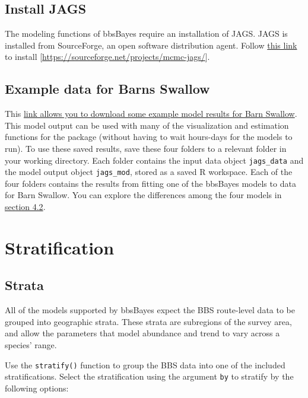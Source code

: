 \documentclass[
]{book}
\begin{document}
\hypertarget{install-jags}{%
\section{Install JAGS}\label{install-jags}}

The modeling functions of bbsBayes require an installation of JAGS. JAGS is installed from SourceForge, an open software distribution agent. Follow \href{https://sourceforge.net/projects/mcmc-jags/}{this link} to install {[}\url{https://sourceforge.net/projects/mcmc-jags/}{]}.

\hypertarget{example-data-for-barns-swallow}{%
\section{Example data for Barns Swallow}\label{example-data-for-barns-swallow}}

This \href{https://drive.google.com/drive/folders/1ar7nUNI3GXm1A_Kcoc2cAUQQ7ZV37wC6?usp=sharing}{link allows you to download some example model results for Barn Swallow}. This model output can be used with many of the visualization and estimation functions for the package (without having to wait hours-days for the models to run). To use these saved results, save these four folders to a relevant folder in your working directory. Each folder contains the input data object \texttt{jags\_data} and the model output object \texttt{jags\_mod}, stored as a saved R workspace. Each of the four folders contains the results from fitting one of the bbsBayes models to data for Barn Swallow. You can explore the differences among the four models in \protect\hyperlink{Model_list}{section 4.2}.

\hypertarget{Stratify}{%
\chapter{Stratification}\label{Stratify}}

\hypertarget{strata}{%
\section{Strata}\label{strata}}

All of the models supported by bbsBayes expect the BBS route-level data to be grouped into geographic strata. These strata are subregions of the survey area, and allow the parameters that model abundance and trend to vary across a species' range.

Use the \texttt{stratify()} function to group the BBS data into one of the included stratifications. Select the stratification using the argument \texttt{by} to stratify by the following options:
\end{document}
